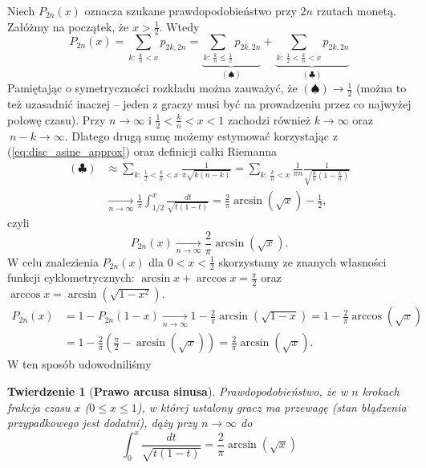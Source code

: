 \documentclass[a4paper,11pt,twoside]{book}
\newcommand{\conv}{\rightarrow}
\newcommand{\Conv}{\longrightarrow}
\newtheorem{twier}{Twierdzenie}[chapter]
\theoremstyle{definition}
\begin{document}
Niech $P_{2n}(x)$ oznacza szukane prawdopodobieństwo przy $2n$ rzutach monetą. Załóżmy na początek, że $x > \frac{1}{2}$. Wtedy
\[ P_{2n}(x) = \sum_{k:\ \frac{k}{n} < x} p_{2k,2n} = \underbrace{\sum_{k:\ \frac{k}{n} \leq \frac{1}{2}} p_{2k,2n}}_{(\spadesuit)} + \underbrace{\sum_{k:\ \frac{1}{2} < \frac{k}{n} < x} p_{2k,2n}}_{(\clubsuit)}  \]
Pamiętając o symetryczności rozkładu można zauważyć, że $(\spadesuit) \Conv \frac{1}{2}$ (można to też uzasadnić inaczej -- jeden z graczy musi być na prowadzeniu przez co najwyżej połowę czasu). Przy $n \conv \infty$ i $\frac{1}{2} < \frac{k}{n} < x < 1$ zachodzi również $k \Conv \infty$ oraz $\ n-k \Conv \infty$. Dlatego drugą sumę możemy estymować korzystając z (\ref{eq:disc_asine_approx}) oraz definicji całki Riemanna
\begin{equation*}
 \begin{split}
 (\clubsuit) &\approx \sum_{k:\ \frac{1}{2} < \frac{k}{n} < x} \frac{1}{\pi \sqrt{k(n-k)}} =  \sum_{k:\ \frac{k}{n} < x} \frac{1}{\pi n} \frac{1}{ \sqrt{\frac{k}{n} (1 - \frac{k}{n})} } \\
 &\xrightarrow[n \conv \infty]{} \frac{1}{\pi} \int_{1/2}^x \frac{dt}{\sqrt{t(1-t)}} = \frac{2}{\pi}\arcsin(\sqrt{x}) - \frac{1}{2},
 \end{split}
\end{equation*}
czyli
\[  P_{2n}(x) \xrightarrow[n \conv \infty]{} \frac{2}{\pi}\arcsin(\sqrt{x}). \]
W celu znalezienia $P_{2n}(x)$ dla $0 < x < \frac{1}{2}$ skorzystamy ze znanych własności funkcji cyklometrycznych: $\arcsin x + \arccos x = \frac{\pi}{2}$ oraz $\arccos x = \arcsin(\sqrt{1-x^2})$.
\begin{equation*}
 \begin{split}
  P_{2n}(x) &= 1 - P_{2n}(1-x) \xrightarrow[n \conv \infty]{} 1 - \frac{2}{\pi} \arcsin(\sqrt{1-x}) = 1 - \frac{2}{\pi} \arccos(\sqrt{x}) \\
  &= 1 - \frac{2}{\pi} \left( \frac{\pi}{2} - \arcsin(\sqrt{x}) \right) = \frac{2}{\pi}\arcsin(\sqrt{x}).
 \end{split}
\end{equation*}
W ten sposób udowodniliśmy
\begin{twier}[\textbf{Prawo arcusa sinusa}]
 Prawdopodobieństwo, że w $n$ krokach frakcja czasu $x$ ($0 \leq x \leq 1$), w której ustalony gracz ma przewagę (stan błądzenia przypadkowego jest dodatni), dąży przy $n \Conv \infty$ do
 \[  \int_0^x \frac{dt}{\sqrt{t(1-t)}} = \frac{2}{\pi}\arcsin(\sqrt{x}) \]
\end{twier}
\end{document}
